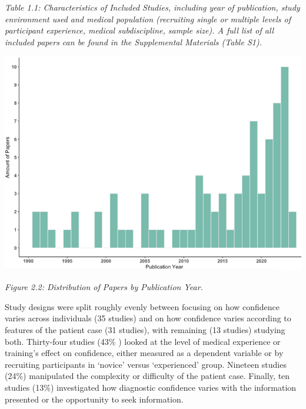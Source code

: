\documentclass[a4paper, nobind]{templates/ociamthesis}
\begin{document}
\emph{Table 1.1: Characteristics of Included Studies, including year of publication, study environment used and medical population (recruiting single or multiple levels of participant experience, medical subdiscipline, sample size). A full list of all included papers can be found in the Supplemental Materials (Table S1).}\\

\begin{center}\includegraphics[width=1\linewidth]{./assets/ReviewYears} \end{center}

\emph{Figure 2.2: Distribution of Papers by Publication Year.}

\hfill\break
Study designs were split roughly evenly between focusing on how confidence varies across individuals (35 studies) and on how confidence varies according to features of the patient case (31 studies), with remaining (13 studies) studying both. Thirty-four studies (43\% ) looked at the level of medical experience or training's effect on confidence, either measured as a dependent variable or by recruiting participants in `novice' versus `experienced' group. Nineteen studies (24\%) manipulated the complexity or difficulty of the patient case. Finally, ten studies (13\%) investigated how diagnostic confidence varies with the information presented or the opportunity to seek information.
\end{document}

